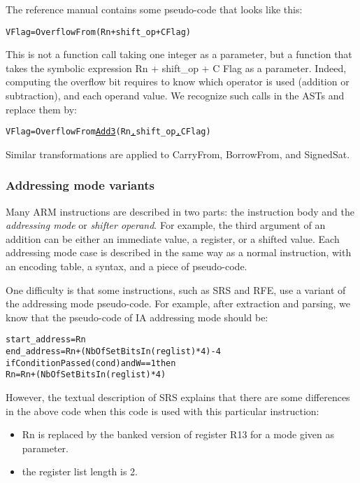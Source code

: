 \documentclass[conference]{ieeeconf}
\begin{document}
The reference manual contains some pseudo-code that looks like this:

{\small
\begin{alltt}
V Flag = OverflowFrom(Rn + shift_op + C Flag)
\end{alltt}
}

This is not a function call taking one integer as a parameter, but a function that
takes the symbolic expression {\stt Rn + shift\_op + C Flag} as a
parameter. Indeed, computing the overflow bit requires to know which operator is
used (addition or subtraction), and each operand value.  We recognize such calls
in the ASTs and replace them by:

{\small
\begin{alltt}
V Flag = OverflowFrom\underline{Add3}(Rn\underline{,}shift_op\underline{,}C Flag)
\end{alltt}
}

Similar transformations are applied to {\stt CarryFrom}, {\stt BorrowFrom}, and
{\stt SignedSat}.

\subsubsection{Addressing mode variants}

Many ARM instructions are described in two parts: the instruction body and the
{\em addressing mode} or {\em shifter operand}. For example, the third argument
of an addition can be either an immediate value, a register, or a shifted value.
Each addressing mode case is described in the same way as a normal
instruction, with an encoding table, a syntax, and a piece of pseudo-code.

One difficulty is that some instructions, such as {\stt SRS} and {\stt RFE}, use
a variant of the addressing mode pseudo-code. For example, after extraction and
parsing, we know that the pseudo-code of {\stt IA} addressing mode should be:

{\small
\begin{alltt}
start_address = Rn
end_address = Rn+(NbOfSetBitsIn(reglist)*4)-4
if ConditionPassed(cond) and W==1 then
    Rn = Rn+(NbOfSetBitsIn(reglist)*4)
\end{alltt}
}

However, the textual description of {\stt SRS} explains that there are some
differences in the above code when this code is used with this particular
instruction:

\begin{itemize}
\item {\stt Rn} is replaced by the banked version of register {\stt R13} for a
  mode given as parameter.
\item the register list length is 2.
\end{itemize}
\end{document}
